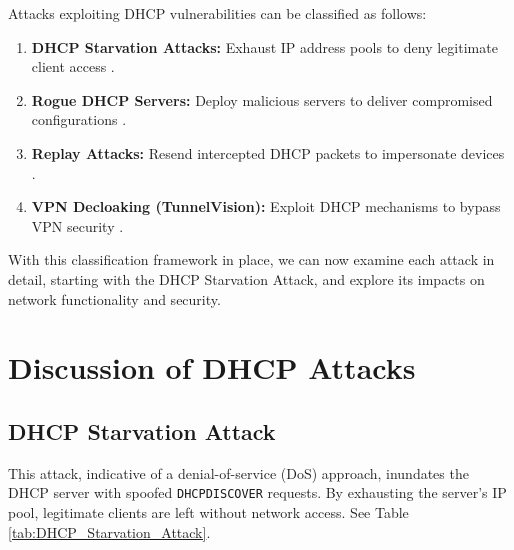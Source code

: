 \documentclass[conference]{IEEEtran}
\begin{document}
    Attacks exploiting DHCP vulnerabilities can be classified as follows:

    \begin{enumerate}
        \item \textbf{DHCP Starvation Attacks:} Exhaust IP address pools to deny legitimate client access \cite{7h30th3r0n32024, Mikhailov2024, AbdulGhaffar2023}.
        \item \textbf{Rogue DHCP Servers:} Deploy malicious servers to deliver compromised configurations \cite{7h30th3r0n32024, Mikhailov2024, AbdulGhaffar2023}.
        \item \textbf{Replay Attacks:} Resend intercepted DHCP packets to impersonate devices \cite{AbdulGhaffar2023}.
        \item \textbf{VPN Decloaking (TunnelVision):} Exploit DHCP mechanisms to bypass VPN security \cite{Moratti2024}.
    \end{enumerate}

    With this classification framework in place, we can now examine each attack in detail, starting with the DHCP Starvation Attack, and explore its impacts on network functionality and security.

\section{Discussion of DHCP Attacks}
\label{sec:Discussion_of_DHCP_Attacks}

    \subsection{DHCP Starvation Attack}
    \label{subsec:DHCP_Starvation_Attack}

        This attack, indicative of a denial-of-service (DoS) approach, inundates the DHCP server with spoofed \texttt{DHCPDISCOVER} requests. By exhausting the server’s IP pool, legitimate clients are left without network access. See Table \ref{tab:DHCP_Starvation_Attack}. 
\end{document}
